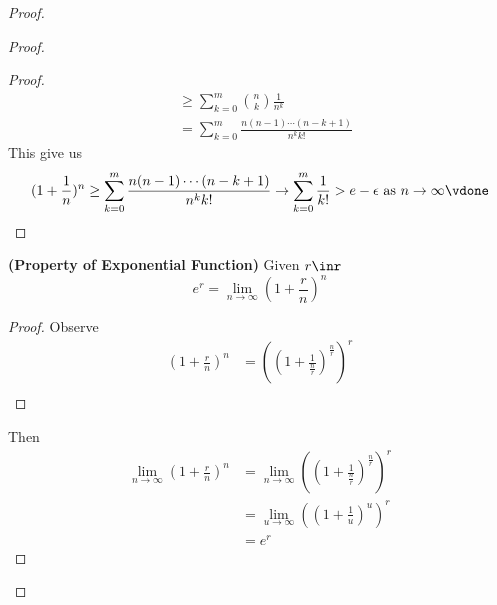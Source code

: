 \documentclass{report}
\begin{document}
\begin{proof}
\begin{proof}
\begin{proof}
\begin{align*}
  &\geq \sum_{k=0}^m \binom{n}{k}\frac{1}{n^k}\\
  &=\sum_{k=0}^m \frac{n(n-1)\cdots (n-k+1)}{n^k k!}
\end{align*}
This give us  
\begin{equation*}
  (1+\frac{1}{n})^n\geq \sum_{k=0}^m \frac{n(n-1)\cdots (n-k+1)}{n^kk!}\to \sum_{k=0}^m \frac{1}{k!}>e-\epsilon \text{ as }n\to \infty \vdone
\end{equation*}
\end{proof}
\begin{theorem}
\label{4.5.6}
\textbf{(Property of Exponential Function)} Given $r\inr$
\begin{equation*}
 e^r=\lim_{n\to \infty}(1+\frac{r}{n})^n 
\end{equation*}
\end{theorem}
\begin{proof}
Observe 
\begin{align*}
  (1+\frac{r}{n})^n&= ((1+\frac{1}{ \frac{n}{r}})^\frac{n}{r})^r\\
\end{align*}
\end{proof}
Then 
\begin{align*}
\lim_{n \to \infty} (1+\frac{r}{n})^n &= \lim_{n\to \infty}((1+\frac{1}{\frac{n}{r}})^{\frac{n}{r}})^r\\
&=\lim_{u \to \infty}((1+\frac{1}{u})^u)^r\\
&=e^r
\end{align*}




\end{proof}
\end{proof}
\end{document}
